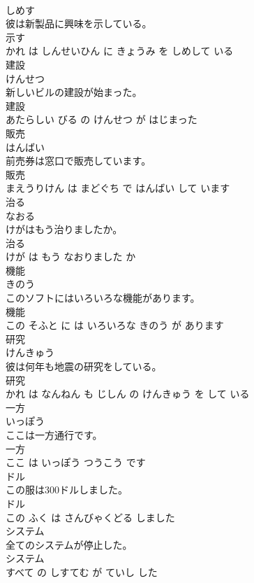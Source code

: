 \documentclass[8pt]{extreport}
\begin{document}
\begin{CJK}{UTF8}{min}
\\	しめす			
\\	彼は新製品に興味を示している。	
\\	示す 
\\	かれ は しんせいひん に きょうみ を しめして いる			
\\	建設	
\\	けんせつ			
\\	新しいビルの建設が始まった。	
\\	建設 
\\	あたらしい びる の けんせつ が はじまった			
\\	販売	
\\	はんばい			
\\	前売券は窓口で販売しています。	
\\	販売 
\\	まえうりけん は まどぐち で はんばい して います			
\\	治る	
\\	なおる			
\\	けがはもう治りましたか。	
\\	治る 
\\	けが は もう なおりました か			
\\	機能	
\\	きのう			
\\	このソフトにはいろいろな機能があります。	
\\	機能 
\\	この そふと に は いろいろな きのう が あります			
\\	研究	
\\	けんきゅう			
\\	彼は何年も地震の研究をしている。	
\\	研究 
\\	かれ は なんねん も じしん の けんきゅう を して いる			
\\	一方	
\\	いっぽう			
\\	ここは一方通行です。	
\\	一方 
\\	ここ は いっぽう つうこう です			
\\	ドル	
\\	この服は300ドルしました。	
\\	ドル 
\\	この ふく は さんびゃくどる しました			
\\	システム	
\\	全てのシステムが停止した。	
\\	システム 
\\	すべて の しすてむ が ていし した			

\end{CJK}
\end{document}
